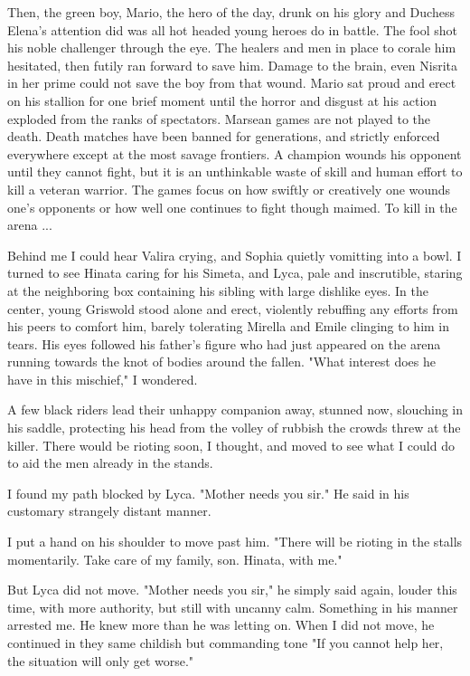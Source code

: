\documentclass{article}
\begin{document}
Then, the green boy, Mario, the hero of the day, drunk on his glory and Duchess Elena's attention did was all hot headed young heroes do in battle. The fool shot his noble challenger through the eye. The healers and men in place to corale him hesitated, then futily ran forward to save him. Damage to the brain, even Nisrita in her prime could not save the boy from that wound. Mario sat proud and erect on his stallion for one brief moment until the horror and disgust at his action exploded from the ranks of spectators. Marsean games are not played to the death. Death matches have been banned for generations, and strictly enforced everywhere except at the most savage frontiers. A champion wounds his opponent until they cannot fight, but it is an unthinkable waste of skill and human effort to kill a veteran warrior. The games focus on how swiftly or creatively one wounds one's opponents or how well one continues to fight though maimed. To kill in the arena ...

Behind me I could hear Valira crying, and Sophia quietly vomitting into a bowl. I turned to see Hinata caring for his Simeta, and Lyca, pale and inscrutible, staring at the neighboring box containing his sibling with large dishlike eyes. In the center, young Griswold stood alone and erect, violently rebuffing any efforts from his peers to comfort him, barely tolerating Mirella and Emile clinging to him in tears. His eyes followed his father's figure who had just appeared on the arena running towards the knot of bodies around the fallen. "What interest does he have in this mischief," I wondered.

A few black riders lead their unhappy companion away, stunned now, slouching in his saddle, protecting his head from the volley of rubbish the crowds threw at the killer. There would be rioting soon, I thought, and moved to see what I could do to aid the men already in the stands.

I found my path blocked by Lyca. "Mother needs you sir." He said in his customary strangely distant manner.

I put a hand on his shoulder to move past him. "There will be rioting in the stalls momentarily. Take care of my family, son. Hinata, with me."

But Lyca did not move. "Mother needs you sir," he simply said again, louder this time, with more authority, but still with uncanny calm. Something in his manner arrested me. He knew more than he was letting on. When I did not move, he continued in they same childish but commanding tone "If you cannot help her, the situation will only get worse."
\end{document}
